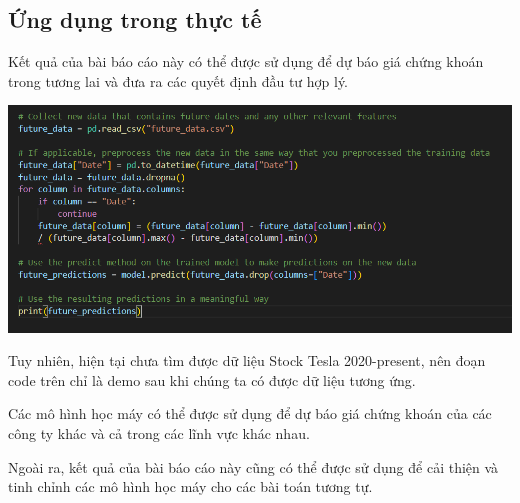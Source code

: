 \documentclass[12pt,a4paper]{article}
\begin{document}
\begin{enumerate}
	\end{enumerate}
	
	\subsection{Ứng dụng trong thực tế}
	\begin{enumerate}
		
		Kết quả của bài báo cáo này có thể được sử dụng để dự báo giá chứng khoán trong tương lai và đưa ra các quyết định đầu tư hợp lý.
		
		\includegraphics{8}
		
		Tuy nhiên, hiện tại chưa tìm được dữ liệu Stock Tesla 2020-present, nên đoạn code trên chỉ là demo sau khi chúng ta có được dữ liệu tương ứng. 
		
		Các mô hình học máy có thể được sử dụng để dự báo giá chứng khoán của các công ty khác và cả trong các lĩnh vực khác nhau. 
		
		Ngoài ra, kết quả của bài báo cáo này cũng có thể được sử dụng để cải thiện và tinh chỉnh các mô hình học máy cho các bài toán tương tự.
		
	\end{enumerate}
\end{document}
